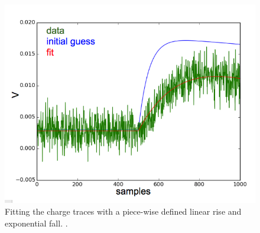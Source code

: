  \begin{figure}[htbp]
\begin{center}
\includegraphics[width =\textwidth ]{figures/testbed/charge_fit.png}
\caption{Fitting the charge traces with a piece-wise defined linear rise and exponential fall. .}
\label{fig:charge_fit}
\end{center}
\end{figure}


